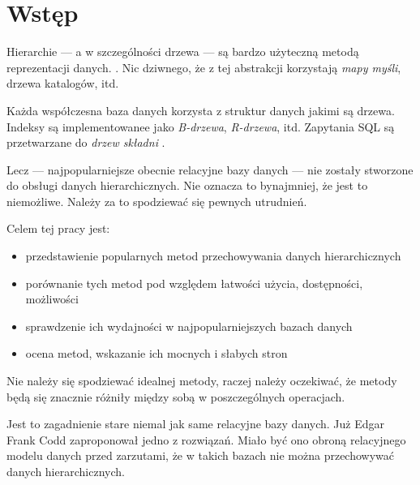 \chapter*{Wstęp}




Hierarchie --- a w szczególności drzewa --- są bardzo użyteczną metodą reprezentacji danych. . 
Nic dziwnego, że z tej abstrakcji korzystają \emph{mapy myśli}, drzewa katalogów, itd.

Każda współczesna baza danych korzysta z struktur danych jakimi są drzewa. 
Indeksy są implementowanee jako \emph{B-drzewa}, \emph{R-drzewa}, itd.
Zapytania SQL są przetwarzane do \emph{drzew składni} .

Lecz --- najpopularniejsze obecnie relacyjne bazy danych --- nie zostały stworzone do obsługi danych hierarchicznych.
Nie oznacza to bynajmniej, że jest to niemożliwe.
Należy za to spodziewać się pewnych utrudnień.






Celem tej pracy jest:
\begin{itemize}
    \item przedstawienie popularnych metod przechowywania danych hierarchicznych
    \item porównanie tych metod pod względem łatwości użycia, dostępności, możliwości
    \item sprawdzenie ich wydajności w najpopularniejszych bazach danych
    \item ocena metod, wskazanie ich mocnych i słabych stron
\end{itemize}

Nie należy się spodziewać idealnej metody, raczej należy oczekiwać, że metody będą się znacznie różniły między sobą w poszczególnych operacjach.


Jest to zagadnienie stare niemal jak same relacyjne bazy danych. 
Już Edgar Frank Codd zaproponował jedno z rozwiązań.
Miało być ono obroną relacyjnego modelu danych przed zarzutami, 
że w takich bazach nie można przechowywać danych hierarchicznych.



